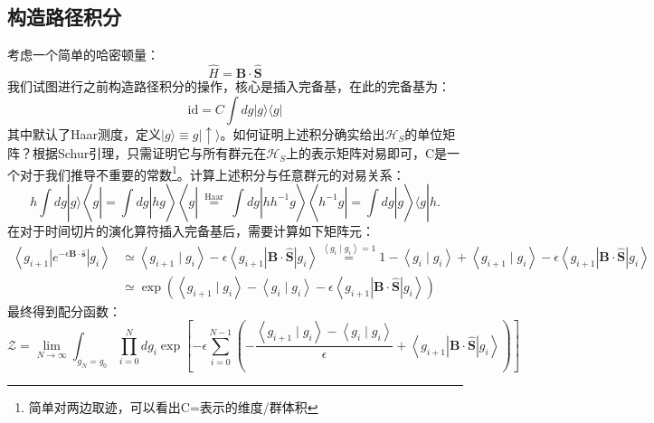 \documentclass[10pt,openany]{book}
\theoremstyle{thmstyle} %
\theoremstyle{defstyle} %
\theoremstyle{prostyle} %
\begin{document}
\subsection{构造路径积分}
考虑一个简单的哈密顿量：
\begin{equation}
	\hat{H}=\mathbf{B} \cdot \hat{\mathbf{S}}
\end{equation} 
我们试图进行之前构造路径积分的操作，核心是插入完备基，在此的完备基为：
\begin{equation}
	\mathrm{id}=C \int d g|g\rangle\langle g|
\end{equation}
其中默认了Haar测度，定义$ |g\rangle \equiv g|\uparrow\rangle $。如何证明上述积分确实给出$ \mathcal{H}_S $的单位矩阵？根据Schur引理，只需证明它与所有群元在$ \mathcal{H}_S $上的表示矩阵对易即可，C是一个对于我们推导不重要的常数\footnote{简单对两边取迹，可以看出C=表示的维度/群体积}。计算上述积分与任意群元的对易关系：
\begin{equation}
	h \int d g|g\rangle\left\langle g\left|=\int d g\right| h g\right\rangle\left\langle g\left|\stackrel{\text { Haar }}{=} \int d g\right| h h^{-1} g\right\rangle\left\langle h^{-1} g\left|=\int d g\right| g\right\rangle\langle g| h .
\end{equation}
在对于时间切片的演化算符插入完备基后，需要计算如下矩阵元：
\begin{equation}
	\begin{aligned}
		\left\langle g_{i+1}\left|e^{-\epsilon \mathbf{B} \cdot \hat{\mathbf{s}}}\right| g_i\right\rangle & \simeq\left\langle g_{i+1} \mid g_i\right\rangle-\epsilon\left\langle g_{i+1}|\mathbf{B} \cdot \hat{\mathbf{S}}| g_i\right\rangle \stackrel{\left\langle g_i \mid g_i\right\rangle=1}{=} 1-\left\langle g_i \mid g_i\right\rangle+\left\langle g_{i+1} \mid g_i\right\rangle-\epsilon\left\langle g_{i+1}|\mathbf{B} \cdot \hat{\mathbf{S}}| g_i\right\rangle \\
		& \simeq \exp \left(\left\langle g_{i+1} \mid g_i\right\rangle-\left\langle g_i \mid g_i\right\rangle-\epsilon\left\langle g_{i+1}|\mathbf{B} \cdot \hat{\mathbf{S}}| g_i\right\rangle\right)
		\end{aligned}
\end{equation}
最终得到配分函数：
\begin{equation}
	\mathcal{Z}=\lim _{N \rightarrow \infty} \int_{g_N=g_0} \prod_{i=0}^N d g_i \exp \left[-\epsilon \sum_{i=0}^{N-1}\left(-\frac{\left\langle g_{i+1} \mid g_i\right\rangle-\left\langle g_i \mid g_i\right\rangle}{\epsilon}+\left\langle g_{i+1}|\mathbf{B} \cdot \hat{\mathbf{S}}| g_i\right\rangle\right)\right]
\end{equation}
\end{document}
